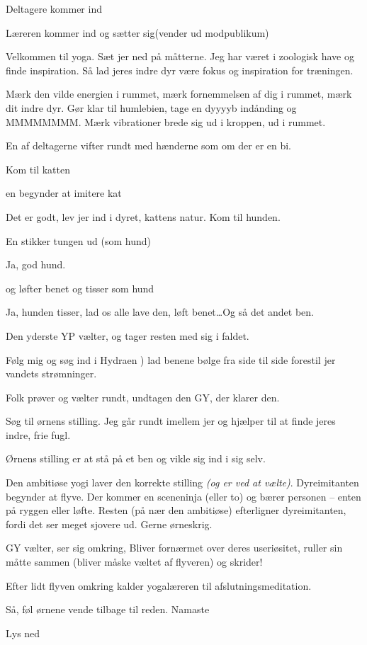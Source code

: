 \documentclass[a4paper,11pt]{article}
\begin{document}
\begin{sketch}



\scene Deltagere kommer ind

\scene Læreren kommer ind og sætter sig(vender ud modpublikum)

 Velkommen til yoga. Sæt jer ned på måtterne. Jeg har været i zoologisk have og finde inspiration. Så lad jeres indre dyr være fokus og inspiration for træningen.

Mærk den vilde energien i rummet, mærk fornemmelsen af dig i rummet, mærk dit indre dyr. 
 Gør klar til humlebien, tage en dyyyyb indånding og MMMMMMMM. Mærk vibrationer brede sig ud i kroppen, ud i rummet.

\scene En af deltagerne vifter rundt med hænderne som om der er en bi.

 Kom til katten

\scene en begynder at imitere kat 

 Det er godt, lev jer ind i dyret, kattens natur.
 Kom til hunden.

\scene En stikker tungen ud (som hund)

 Ja, god hund.

\scene og løfter benet og tisser som hund

 Ja, hunden tisser, lad os alle lave den, løft benet\ldots Og så det andet ben.

\scene Den yderste YP vælter, og tager resten med sig i faldet.

 Følg mig og søg ind i Hydraen )  lad benene bølge fra side til side forestil jer vandets strømninger.

\scene Folk prøver og vælter rundt, undtagen den GY, der klarer den.

 Søg til ørnens stilling. Jeg går rundt imellem jer og hjælper til at finde jeres indre, frie fugl.

\scene Ørnens stilling er at stå på et ben og vikle sig ind i sig selv. 

\scene Den ambitiøse yogi laver den korrekte stilling \emph{(og er ved at vælte)}. Dyreimitanten begynder at flyve. Der kommer en sceneninja (eller to) og bærer personen – enten på ryggen eller løfte. Resten (på nær den ambitiøse) efterligner dyreimitanten, fordi det ser meget sjovere ud. Gerne ørneskrig. 

\scene GY vælter, ser sig omkring, Bliver fornærmet over deres useriøsitet, ruller sin måtte sammen (bliver måske væltet af flyveren) og skrider! 

\scene Efter lidt flyven omkring kalder yogalæreren til afslutningsmeditation. 

 Så, føl ørnene vende tilbage til reden. Namaste

\scene Lys ned

\end{sketch}
\end{document}
